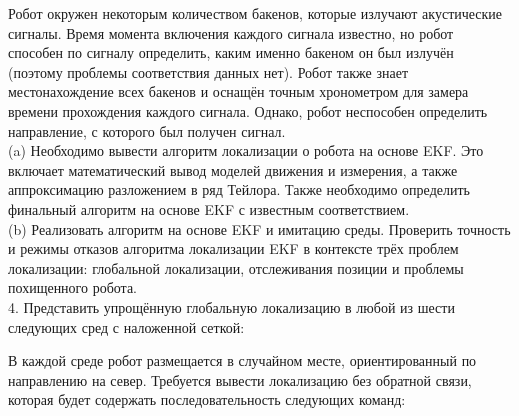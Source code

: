 \documentclass[10pt,a4paper]{article}
\begin{document}
Робот окружен некоторым количеством бакенов, которые излучают акустические сигналы. Время момента включения каждого сигнала известно, но робот способен по сигналу определить, каким именно бакеном он был излучён (поэтому проблемы соответствия данных нет). Робот также знает местонахождение всех бакенов и оснащён точным хронометром для замера времени прохождения каждого сигнала. Однако, робот неспособен определить направление, с которого был получен сигнал. \\

(a) Необходимо вывести алгоритм локализации о робота на основе EKF.
Это включает математический вывод моделей движения и измерения, а также аппроксимацию разложением в ряд Тейлора. Также необходимо определить финальный алгоритм на основе EKF с известным соответствием.
\\

(b) Реализовать алгоритм на основе EKF и имитацию среды.
Проверить точность и режимы отказов алгоритма локализации EKF в контексте трёх проблем локализации: глобальной локализации, отслеживания позиции и проблемы похищенного робота.\\

4. Представить упрощённую глобальную локализацию в любой из шести следующих сред с наложенной сеткой:

\begin{figure}[H]
	\label{fig:717orig}
\end{figure}

В каждой среде робот размещается в случайном месте, ориентированный по направлению на север. Требуется вывести локализацию без обратной связи, которая будет содержать последовательность следующих команд:\\
\end{document}
